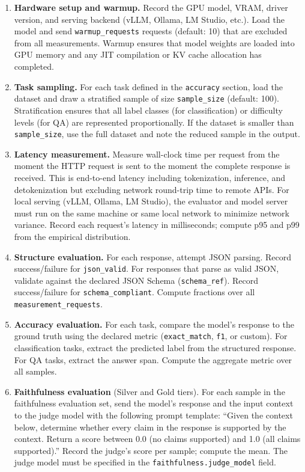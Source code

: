 \documentclass[11pt]{article}
\begin{document}
\begin{enumerate}[leftmargin=16pt]
  \item \textbf{Hardware setup and warmup.} Record the GPU model, VRAM, driver version, and serving backend (vLLM, Ollama, LM Studio, etc.). Load the model and send \texttt{warmup\_requests} requests (default: 10) that are excluded from all measurements. Warmup ensures that model weights are loaded into GPU memory and any JIT compilation or KV cache allocation has completed.

  \item \textbf{Task sampling.} For each task defined in the \texttt{accuracy} section, load the dataset and draw a stratified sample of size \texttt{sample\_size} (default: 100). Stratification ensures that all label classes (for classification) or difficulty levels (for QA) are represented proportionally. If the dataset is smaller than \texttt{sample\_size}, use the full dataset and note the reduced sample in the output.

  \item \textbf{Latency measurement.} Measure wall-clock time per request from the moment the HTTP request is sent to the moment the complete response is received. This is end-to-end latency including tokenization, inference, and detokenization but excluding network round-trip time to remote APIs. For local serving (vLLM, Ollama, LM Studio), the evaluator and model server must run on the same machine or same local network to minimize network variance. Record each request's latency in milliseconds; compute p95 and p99 from the empirical distribution.

  \item \textbf{Structure evaluation.} For each response, attempt JSON parsing. Record success/failure for \texttt{json\_valid}. For responses that parse as valid JSON, validate against the declared JSON Schema (\texttt{schema\_ref}). Record success/failure for \texttt{schema\_compliant}. Compute fractions over all \texttt{measurement\_requests}.

  \item \textbf{Accuracy evaluation.} For each task, compare the model's response to the ground truth using the declared metric (\texttt{exact\_match}, \texttt{f1}, or custom). For classification tasks, extract the predicted label from the structured response. For QA tasks, extract the answer span. Compute the aggregate metric over all samples.

  \item \textbf{Faithfulness evaluation} (Silver and Gold tiers). For each sample in the faithfulness evaluation set, send the model's response and the input context to the judge model with the following prompt template: ``Given the context below, determine whether every claim in the response is supported by the context. Return a score between 0.0 (no claims supported) and 1.0 (all claims supported).'' Record the judge's score per sample; compute the mean. The judge model must be specified in the \texttt{faithfulness.judge\_model} field.


\end{enumerate}
\end{document}
